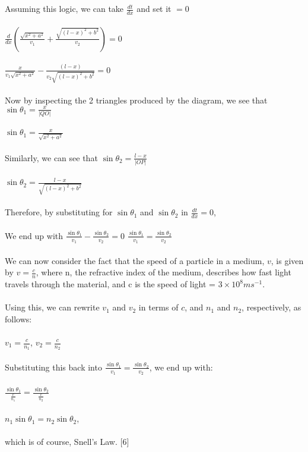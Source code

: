 \documentclass[12pt]{report}
\begin{document}
\\
\\
Assuming this logic, we can take \(\frac{dt}{dx}\) and set it \(=0\)
\\
\\
\implies \(\frac{d}{dx}(\frac{\sqrt{x^2 + a^2}}{v_{1}}+\frac{\sqrt{(l-x)^2+b^2}}{v_{2}}) = 0\)
\\
\\
\implies \(\frac{x}{v_{1}\sqrt{x^2 + a^2}}-\frac{(l-x)}{v_{2}\sqrt{(l-x)^2+b^2}} = 0\)
\\
\\
Now by inspecting the 2 triangles produced by the diagram, we see that \(\sin{\theta_{1}} = \frac{x}{|QO|}\)
\\
\\
\implies \(\sin{\theta_{1}} = \frac{x}{\sqrt{x^2 + a^2}}\)
\\
\\
Similarly, we can see that \(\sin{\theta_{2}} = \frac{l-x}{|OP|}\)
\\
\\
\implies \(\sin{\theta_{2}} = \frac{l-x}{\sqrt{(l-x)^2+b^2}}\)
\\
\\
Therefore, by substituting for \(\sin{\theta_{1}}\) and \(\sin{\theta_{2}}\) in \(\frac{dt}{dx} = 0\),
\\
\\
We end up with \(\frac{\sin{\theta_{1}}}{v_{1}} - \frac{\sin{\theta_{2}}}{v_{2}}=0\)
\implies \(\frac{\sin{\theta_{1}}}{v_{1}} = \frac{\sin{\theta_{2}}}{v_{2}}\)
\\
\\
We can now consider the fact that the speed of a particle in a medium, \(v\), is given by \(v = \frac{c}{n}\), where n, the refractive index of the medium, describes how fast light travels through the material, and c is the speed of light = \(3 \times 10^8 ms^{-1}\).
\\
\\
Using this, we can rewrite \(v_{1}\) and \(v_{2}\) in terms of \(c\), and \(n_{1}\) and \(n_{2}\), respectively, as follows:
\\
\\
\(v_{1} = \frac{c}{n_{1}}\), \(v_{2} = \frac{c}{n_{2}}\)
\\
\\
Substituting this back into \(\frac{\sin{\theta_{1}}}{v_{1}} = \frac{\sin{\theta_{2}}}{v_{2}}\), we end up with:
\\
\\
\(\frac{\sin{\theta_{1}}}{\frac{c}{n_{1}}} = \frac{\sin{\theta_{2}}}{\frac{c}{n_{2}}}\)
\\
\\
\implies \(n_{1}\sin{\theta_{1}} = n_{2}\sin{\theta_{2}}\),
\\
\\
which is of course, Snell's Law. [6]
\end{document}

